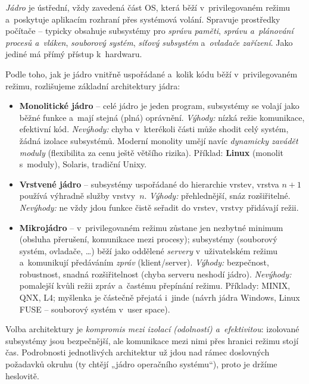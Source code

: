 \begin{definice}
\emph{Jádro} je ústřední, vždy zavedená část OS, která běží v~privilegovaném režimu a~poskytuje aplikacím rozhraní přes systémová volání. Spravuje prostředky počítače -- typicky obsahuje subsystémy pro \emph{správu paměti}, \emph{správu a~plánování procesů a~vláken}, \emph{souborový systém}, \emph{síťový subsystém} a~\emph{ovladače zařízení}. Jako jediné má přímý přístup k~hardwaru.
\end{definice}

Podle toho, jak je jádro vnitřně uspořádané a~kolik kódu běží v~privilegovaném režimu, rozlišujeme základní architektury jádra:

\begin{itemize}
\item \textbf{Monolitické jádro} -- celé jádro je jeden program, subsystémy se volají jako běžné funkce a~mají stejná (plná) oprávnění. \emph{Výhody:} nízká režie komunikace, efektivní kód. \emph{Nevýhody:} chyba v~kterékoli části může shodit celý systém, žádná izolace subsystémů. Moderní monolity umějí navíc \emph{dynamicky zavádět moduly} (flexibilita za cenu ještě většího rizika). Příklad: \textbf{Linux} (monolit s~moduly), Solaris, tradiční Unixy.
\item \textbf{Vrstvené jádro} -- subsystémy uspořádané do hierarchie vrstev, vrstva $n{+}1$ používá výhradně služby vrstvy~$n$. \emph{Výhody:} přehlednější, snáz rozšiřitelné. \emph{Nevýhody:} ne vždy jdou funkce čistě seřadit do vrstev, vrstvy přidávají režii.
\item \textbf{Mikrojádro} -- v~privilegovaném režimu zůstane jen nezbytné minimum (obsluha přerušení, komunikace mezi procesy); subsystémy (souborový systém, ovladače, \dots) běží jako oddělené \emph{servery} v~uživatelském režimu a~komunikují předáváním \emph{zpráv} (klient/server). \emph{Výhody:} bezpečnost, robustnost, snadná rozšiřitelnost (chyba serveru neshodí jádro). \emph{Nevýhody:} pomalejší kvůli režii zpráv a~častému přepínání režimu. Příklady: MINIX, QNX, L4; myšlenka je částečně přejatá i~jinde (návrh jádra Windows, Linux FUSE -- souborový systém v~user space).
\end{itemize}

\begin{poznamka}
Volba architektury je \emph{kompromis mezi izolací (odolností) a~efektivitou}: izolované subsystémy jsou bezpečnější, ale komunikace mezi nimi přes hranici režimu stojí čas. Podrobnosti jednotlivých architektur už jdou nad rámec doslovných požadavků okruhu (ty chtějí „jádro operačního systému``), proto je držíme heslovitě.
\end{poznamka}

